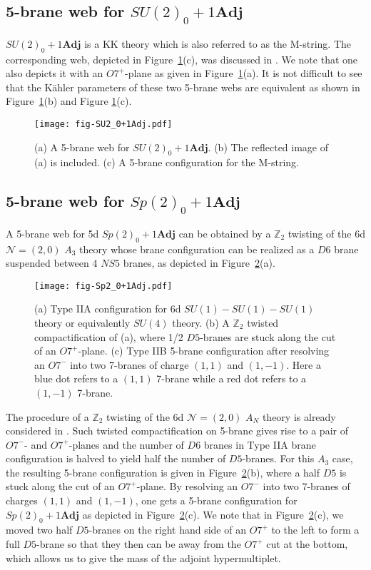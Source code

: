 \subsection{\texorpdfstring{5-brane web for $SU(2)_0+1\mathbf{Adj}$}{5-brane web for SU(2)0 + 1Adj}}

$SU(2)_0+1\mathbf{Adj}$ is a KK theory which is also referred to as the M-string. The corresponding web, depicted in Figure~\ref{fig:su2_0+1adj}(c), was discussed in \cite{Haghighat:2013gba}. We note that one also depicts it with an $O7^+$-plane as given in Figure~\ref{fig:su2_0+1adj}(a). It is not difficult to see that the K\"ahler parameters of these two 5-brane webs are equivalent as shown in Figure~\ref{fig:su2_0+1adj}(b) and Figure \ref{fig:su2_0+1adj}(c).
\begin{figure}[t]
\texttt{[image: fig-SU2\_0+1Adj.pdf]}
\centering	
\caption{(a) A 5-brane web for $SU(2)_0+1\mathbf{Adj}$. (b) The reflected image of (a) is included.  (c) A 5-brane configuration for the M-string.}
\label{fig:su2_0+1adj}
\end{figure}


\subsection{\texorpdfstring{5-brane web for $Sp(2)_{0}+1\mathbf{Adj}$}{5-brane web for Sp(2)0 + 1Adj}}

A 5-brane web for 5d $Sp(2)_0+1\mathbf{Adj}$ can be obtained by a $\mathbb{Z}_2$ twisting of the 6d $\mathcal{N}=(2,0)$ $A_3$ theory whose brane configuration can be realized as a $D6$ brane suspended between 4 $NS5$ branes, as depicted in Figure~\ref{fig:Sp2_0+1Adj}(a).
\begin{figure}[t]
	\texttt{[image: fig-Sp2\_0+1Adj.pdf]}
	\centering	
	\caption{(a) Type IIA configuration for 6d $SU(1)-SU(1)-SU(1)$ theory or equivalently $SU(4)$ theory. (b) A $\mathbb{Z}_2$ twisted compactification of (a), where 1/2 $D5$-branes are stuck along the cut of an $O7^+$-plane. (c) Type IIB 5-brane configuration after resolving an $O7^-$ into two 7-branes of charge $(1,1)$ and $(1, -1)$. Here a blue dot refers to a $(1,1)$ 7-brane while a red dot refers to a $(1,-1)$ 7-brane.}
	\label{fig:Sp2_0+1Adj}
\end{figure} 
The procedure of a $\mathbb{Z}_2$ twisting of the 6d $\mathcal{N}=(2,0)$ $A_N$ theory is already considered in \cite{Hayashi:2015vhy}. Such twisted compactification on 5-brane gives rise to a pair of $O7^-$- and $O7^+$-planes and the number of $D6$ branes in Type IIA brane configuration is halved to yield half the number of $D5$-branes. For this $A_3$ case, the resulting 5-brane configuration is given in Figure~\ref{fig:Sp2_0+1Adj}(b), where a half $D5$ is stuck along the cut of an $O7^+$-plane. By resolving an $O7^-$ into two 7-branes of charges $(1,1)$ and $(1, -1)$, one gets a 5-brane configuration for $Sp(2)_0+1\mathbf{Adj}$ as depicted in Figure~\ref{fig:Sp2_0+1Adj}(c). We note that in Figure~\ref{fig:Sp2_0+1Adj}(c), we moved two half $D5$-branes on the right hand side of an $O7^+$ to the left to form a full $D5$-brane so that they then can be away from the $O7^+$ cut at the bottom, which allows us to give the mass of the adjoint hypermultiplet.


